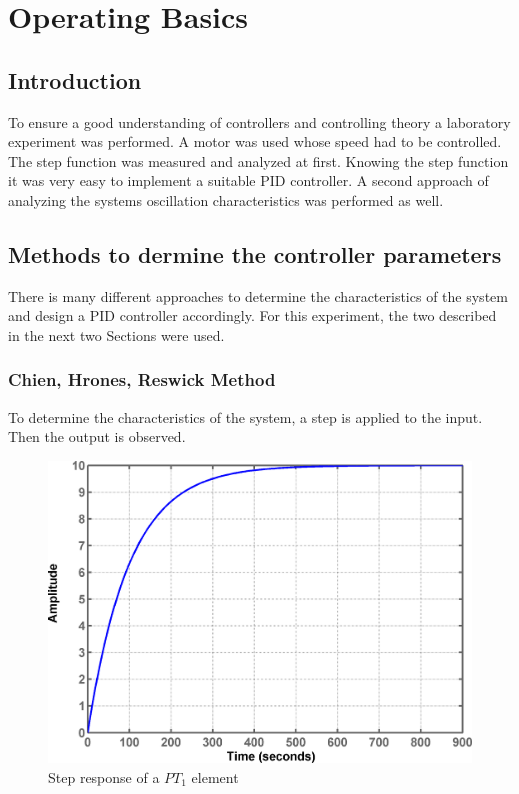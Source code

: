\tableofcontents
\newpage

\section{Operating Basics}

\subsection{Introduction}

To ensure a good understanding of controllers and controlling theory a laboratory experiment was performed. A motor was used whose speed had to be controlled.
The step function was measured and analyzed at first. Knowing the step function it was very easy to implement a suitable PID controller. A second approach of analyzing the systems oscillation characteristics was performed as well.

\subsection{Methods to dermine the controller parameters}

There is many different approaches to determine the characteristics of the system and design a PID controller accordingly. For this experiment, the two described in the next two Sections were used.

\subsubsection{Chien, Hrones, Reswick Method}
\label{subs:Chien, Hrones, Reswick}

To determine the characteristics of the system, a step is applied to the input. Then the output is observed.

\begin{figure}[H]
\begin{center}
\includegraphics[width=0.5\linewidth]{images/general/step_pt1}
\end{center}
\caption{Step response of a $PT_1$ element}
\label{fig:step_pt1}
\end{figure}

